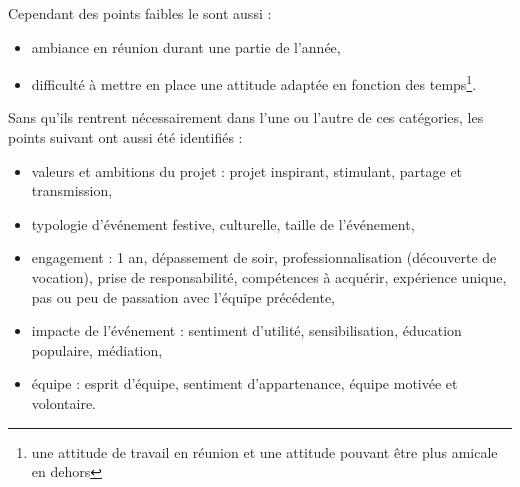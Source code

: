 \documentclass[12pt,a4paper]{report}
\begin{document}
Cependant des points faibles le sont aussi : 
\begin{itemize}
\item ambiance en réunion durant une partie de l'année,
\item difficulté à mettre en place une attitude adaptée en fonction des temps\footnote{une attitude de travail en réunion et une attitude pouvant être plus amicale en dehors}.\\
\end{itemize}

Sans qu'ils rentrent nécessairement dans l'une ou l'autre de ces catégories, les points suivant ont aussi été identifiés :
\begin{itemize}
\item valeurs et ambitions du projet : projet inspirant, stimulant, partage et transmission,
\item typologie d'événement festive, culturelle, taille de l'événement,
\item engagement : 1 an, dépassement de soir, professionnalisation (découverte de vocation), prise de responsabilité, compétences à acquérir, expérience unique, pas ou peu de passation avec l'équipe précédente,
\item impacte de l'événement : sentiment d'utilité, sensibilisation, éducation populaire, médiation,
\item équipe : esprit d'équipe, sentiment d'appartenance, équipe motivée et volontaire.\\
\end{itemize}
\end{document}
